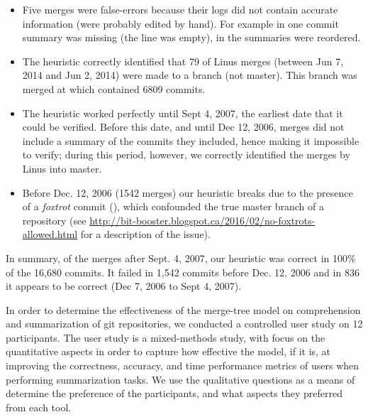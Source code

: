 \documentclass[conference, draftclsnofoot, draft]{IEEEtran}
\begin{document}
\begin{itemize}

  \item

    Five merges were false-errors because their logs did not contain
    accurate information (were probably edited by hand). For example in
     one commit summary was missing (the line was
    empty), in  the summaries were reordered.

  \item

    The heuristic correctly identified that 79 of Linus merges (between
    Jun 7, 2014 and Jun 2, 2014) were made to a branch (not master).
    This branch was merged at  which contained 6809
    commits.

  \item

    The heuristic worked perfectly until Sept 4, 2007, the earliest date
    that it could be verified.  Before this date, and until Dec 12,
    2006, merges did not include a summary of the commits they included,
    hence making it impossible to verify; during this period, however,
    we correctly identified the merges by Linus into master.

  \item

    Before Dec. 12, 2006 (1542 merges) our heuristic breaks due to the
    presence of a \textit{foxtrot} commit (),
    which confounded the true master branch of a repository (see
    \url{http://bit-booster.blogspot.ca/2016/02/no-foxtrots-allowed.html}
    for a description of the issue).

\end{itemize}

In summary, of the merges after Sept. 4, 2007, our heuristic was correct
in 100\% of the 16,680 commits. It failed in 1,542 commits before Dec.
12, 2006 and in 836 it appears to be correct (Dec 7, 2006 to Sept 4,
2007).


In order to determine the effectiveness of the merge-tree model on
comprehension and summarization of git repositories, we conducted a
controlled user study on 12 participants. The user study is a
mixed-methods study, with focus on the quantitative aspects in order to
capture how effective the \mt model, if it is, at improving the
correctness, accuracy, and time performance metrics of users when
performing summarization tasks. We use the qualitative questions as a
means of determine the preference of the participants, and what aspects
they preferred from each tool.
\end{document}
